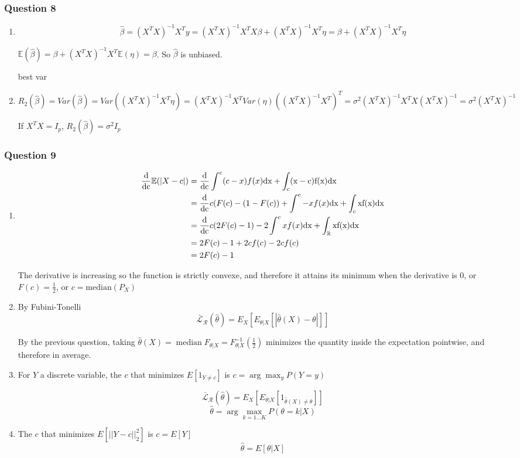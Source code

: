 \documentclass[12pt]{article}
\newcommand{\Q}[1]{\subsubsection*{Question #1}}
\newcommand{\Es}[1]{\mathbb{E}(#1)}
\begin{document}
\Q{8}
\begin{enumerate}


\item 

$$\hat \beta = (X^TX)^{-1} X^T y  = (X^TX)^{-1} X^T X \beta + (X^TX)^{-1} X^T \eta = \beta + (X^TX)^{-1} X^T \eta$$

$\Es {\hat \beta} = \beta + (X^TX)^{-1} X^T \Es{\eta} = \beta$. So $\hat \beta$ is unbiased.

best var
\item $R_2(\hat \beta) = Var(\hat \beta) = Var((X^TX)^{-1} X^T \eta) = (X^TX)^{-1} X^T Var(\eta) ((X^TX)^{-1} X^T)^T = \sigma^2 (X^TX)^{-1} X^T X (X^TX)^{-1} = \sigma^2 (X^TX)^{-1}$

If $X^TX = I_p$, $R_2(\hat \beta) = \sigma^2 I_p$
\end{enumerate}



\Q{9}
\begin{enumerate}
\item 

\begin{align*}
\frac{\rm d}{\rm d c} \Es {|X-c|} &= \frac{\rm d}{\rm d c} \int^c (c-x)f(x) \rm{dx} + \int_c (x-c)f(x) \rm{dx} 
\\&= \frac{\rm d}{\rm d c} c (F(c) - (1-F(c)) + \int^c -xf(x) \rm{dx} + \int_c x f(x) \rm{dx}
\\&= \frac{\rm d}{\rm d c} c (2F(c) - 1) - 2 \int^c xf(x) \rm{dx} + \int_{\mathbb{R}} x f(x) \rm{dx}
\\&= 2F(c)-1 + 2cf(c) - 2 cf(c) 
\\&= 2F(c)-1
\end{align*}

The derivative is increasing so the function is strictly convexe, and therefore it attains its minimum when the derivative is 0, or $F(c) = \frac12$, or $c = \text{median}(P_X)$ 

\item 


By Fubini-Tonelli
$$\bar {\mathcal L}_{\mathcal R} (\hat \theta) = E_X[ E_{\theta|X}[|\hat \theta(X) - \theta|] ]$$

By the previous question, taking  $\hat \theta(X) = \operatorname{median}F_{\theta|X} = F_{\theta|X}^{-1}(\frac12)$ minimizes the quantity inside the expectation pointwise, and therefore in average.



\item 
For $Y$ a discrete variable, the $c$ that minimizes $E[1_{Y \neq c}]$ is $c = \arg \max_y P(Y = y)$

$$\bar {\mathcal L}_{\mathcal R} (\hat \theta) = E_X[ E_{\theta|X}[1_{\hat \theta(X) \neq \theta}] ]$$
$$\hat \theta = \arg \max_{k=1...K} P(\theta = k | X)$$

\item The $c$ that minimizes $E[||Y - c||_2^2]$ is $c = E[Y]$
$$\hat \theta = E[\theta | X]$$
\end{enumerate}
\end{document}

